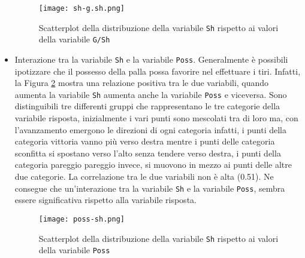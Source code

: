 \begin{itemize}
\begin{figure}[htbp]
	\begin{center}
		\texttt{[image: sh-g.sh.png]}
		\caption{Scatterplot della distribuzione della variabile \texttt{Sh} rispetto ai valori della variabile \texttt{G/Sh}}  \label{fig:shgol}
	\end{center}
\end{figure}

\item Interazione tra la variabile \texttt{Sh} e la variabile \texttt{Poss}. Generalmente è possibili ipotizzare che il possesso della palla possa favorire nel effettuare i tiri. Infatti, la Figura \ref{fig:shposs} mostra una relazione positiva tra le due variabili, quando aumenta la variabile \texttt{Sh} aumenta anche la variabile \texttt{Poss} e viceversa. Sono distinguibili tre differenti gruppi che rappresentano le tre categorie della variabile risposta, inizialmente i vari punti sono mescolati tra di loro ma, con l'avanzamento emergono le direzioni di ogni categoria infatti, i punti della categoria vittoria vanno più verso destra mentre i punti delle categoria sconfitta si spostano verso l'alto senza tendere verso destra, i punti della categoria pareggio pareggio invece, si muovono in mezzo ai punti delle altre due categorie. La correlazione tra le due variabili non è alta (0.51). Ne consegue che un'interazione tra la variabile \texttt{Sh} e la variabile \texttt{Poss}, sembra essere significativa rispetto alla variabile risposta.

\begin{figure}[htbp]
	\begin{center}
		\texttt{[image: poss-sh.png]}
		\caption{Scatterplot della distribuzione della variabile \texttt{Sh} rispetto ai valori della variabile \texttt{Poss}}  \label{fig:shposs}
	\end{center}
\end{figure}
\end{itemize}


